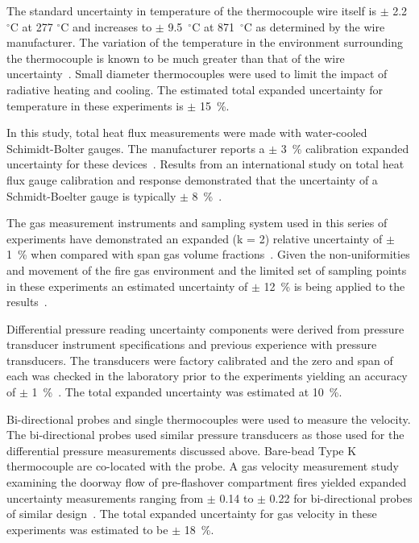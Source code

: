 \documentclass[12pt,oneside]{book}
\begin{document}
The standard uncertainty in temperature of the thermocouple wire itself is $\pm$ 2.2 $^{\circ}$C at 277 $^{\circ}$C and increases to $\pm$ 9.5~$^{\circ}$C at 871~$^{\circ}$C as determined by the wire manufacturer\cite{Omega:2004}. The variation of the temperature in the environment surrounding the thermocouple is known to be much greater than that of the wire uncertainty~\cite{Blevins:1999,Pitts:2003}. Small diameter thermocouples were used to limit the impact of radiative heating and cooling. The estimated total expanded uncertainty for temperature in these experiments is $\pm$ 15~\%.

In this study, total heat flux measurements were made with water-cooled Schimidt-Bolter gauges. The manufacturer reports a $\pm$ 3~\% calibration expanded uncertainty for these devices~\cite{Medtherm:2003}. Results from an international study on total heat flux gauge calibration and response demonstrated that the uncertainty of a Schmidt-Boelter gauge is typically $\pm$ 8~\%~\cite{Pitts:2006}.

The gas measurement instruments and sampling system used in this series of experiments have demonstrated an expanded (k = 2) relative uncertainty of $\pm$ 1~\% when compared with span gas volume fractions~\cite{Bundy:2007}. Given the non-uniformities and movement of the fire gas environment and the limited set of sampling points in these experiments an estimated uncertainty of $\pm$ 12~\% is being applied to the results~\cite{Lock:1}.

Differential pressure reading uncertainty components were derived from pressure transducer instrument specifications and previous experience with pressure transducers. The transducers were factory calibrated and the zero and span of each was checked in the laboratory prior to the experiments yielding an accuracy of $\pm$ 1~\%~\cite{Setra:2002}. The total expanded uncertainty was estimated at 10~\%.

Bi-directional probes and single thermocouples were used to measure the velocity. The bi-directional probes used similar pressure transducers as those used for the differential pressure measurements discussed above. Bare-bead Type K thermocouple are co-located with the probe. A gas velocity measurement study examining the doorway flow of pre-flashover compartment fires yielded expanded uncertainty measurements ranging from $\pm$ 0.14 to $\pm$ 0.22 for bi-directional probes of similar design~\cite{Bryant:FSJ2009}. The total expanded uncertainty for gas velocity in these experiments was estimated to be $\pm$ 18~\%.
\end{document}
